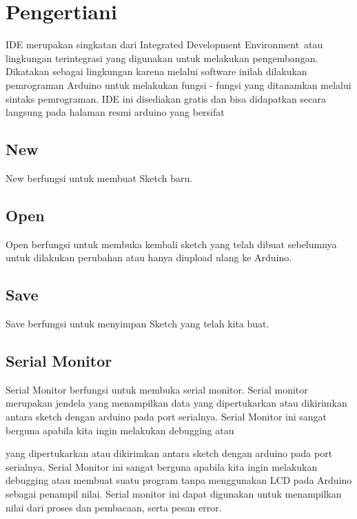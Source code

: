 ﻿%

\section{Pengertiani}


IDE merupakan singkatan dari Integrated Development Environment atau lingkungan terintegrasi yang digunakan untuk melakukan pengembangan. Dikatakan sebagai lingkungan karena melalui software inilah dilakukan pemrograman Arduino untuk melakukan fungsi - fungsi yang ditanamkan melalui sintaks pemrograman. IDE ini disediakan gratis dan bisa didapatkan secara langsung pada halaman resmi arduino yang bersifat        
\subsection{New}
New berfungsi untuk membuat Sketch baru.
\subsection{Open}
Open berfungsi untuk membuka kembali sketch yang telah dibuat sebelumnya untuk dilakukan perubahan atau hanya diupload ulang ke Arduino.
\subsection{Save}
Save berfungsi untuk menyimpan Sketch yang telah kita buat.
\subsection{Serial Monitor}
Serial Monitor berfungsi untuk membuka serial monitor. Serial monitor merupakan jendela yang menampilkan data yang dipertukarkan atau dikirimkan antara sketch dengan arduino pada port serialnya. Serial Monitor ini sangat berguna apabila kita ingin melakukan debugging atau


yang dipertukarkan atau dikirimkan antara sketch dengan arduino pada port serialnya. Serial Monitor ini sangat berguna apabila kita ingin melakukan debugging atau membuat suatu program tanpa menggunakan LCD pada Arduino sebagai penampil nilai. Serial monitor ini dapat digunakan untuk menampilkan nilai dari proses dan pembacaan, serta pesan error.

